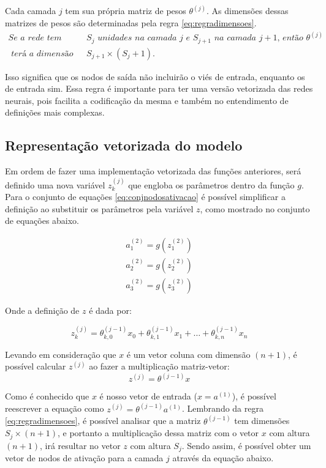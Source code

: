 Cada camada $j$ tem sua própria matriz de pesos $\theta^{(j)}$. As dimensões dessas matrizes de pesos são determinadas pela regra \ref{eq:regradimensoes}. 
\begin{align} 
\textit{Se a rede tem } & S_j \textit{ unidades na camada } j \textit{ e } S_{j+1} \textit{ na camada } j+1\textit{, então } \theta^{(j)} \nonumber \\ 
\textit{ terá a dimensão de } & S_{j+1} \times (S_j + 1)\textit{.} \label{eq:regradimensoes}
\end{align}

Isso significa que os nodos de saída não incluirão o viés de entrada, enquanto os de entrada sim. Essa regra é importante para ter uma versão vetorizada das redes neurais, pois facilita a codificação da mesma e também no entendimento de definições mais complexas.


\subsection{Representação vetorizada do modelo}

Em ordem de fazer uma implementação vetorizada das funções anteriores, será definido uma nova variável $z_k^{(j)}$ que engloba os parâmetros dentro da função $g$. Para o conjunto de equações \ref{eq:conjnodosativacao} é possível simplificar a definição ao substituir os parâmetros pela variável $z$, como mostrado no conjunto de equações abaixo.

\begin{align}
a_1^{(2)} = g(z_1^{(2)}) \nonumber \\
a_2^{(2)} = g(z_2^{(2)}) \nonumber \\
a_3^{(2)} = g(z_3^{(2)}) \nonumber
\end{align}

Onde a definição de $z$ é dada por:

\begin{equation}
z_k^{(j)} = \theta_{k,0}^{(j-1)}x_0 + \theta_{k,1}^{(j-1)}x_1 + \ldots + \theta_{k,n}^{(j-1)}x_n \nonumber
\end{equation}

Levando em consideração que $x$ é um vetor coluna com dimensão $(n+1)$, é possível calcular $z^{(j)}$ ao fazer a multiplicação matriz-vetor:
\begin{equation}
z^{(j)} = \theta^{(j-1)}x \nonumber
\end{equation}

Como é conhecido que $x$ é nosso vetor de entrada ($x = a^{(1)}$), é possível reescrever a equação como $z^{(j)} = \theta^{(j-1)}a^{(1)}$. Lembrando da regra \ref{eq:regradimensoes}, é possível analisar que a matriz  $\theta^{(j-1)}$ tem dimensões $S_j \times (n+1)$, e portanto a multiplicação dessa matriz com o vetor $x$ com altura $(n+1)$, irá resultar no vetor $z$ com altura $S_j$. Sendo assim, é possível obter um vetor de nodos de ativação para a camada $j$ através da equação abaixo.

